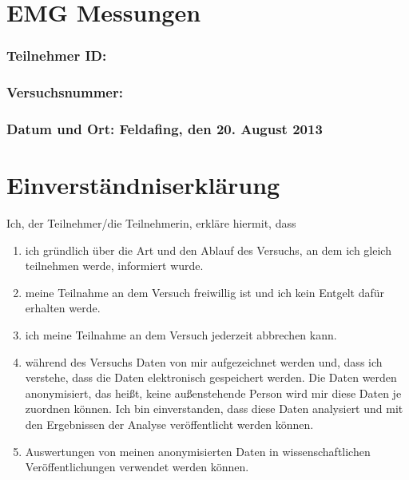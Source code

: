 \documentclass{article}
\begin{document}
\section*{EMG Messungen}
\subsubsection*{Teilnehmer ID:}
\subsubsection*{Versuchsnummer:}
\subsubsection*{Datum und Ort: Feldafing, den 20. August 2013}
\vspace{1cm}
\section*{Einverständniserklärung}

Ich, der Teilnehmer/die Teilnehmerin, erkläre hiermit, dass
\begin{enumerate}
\item ich gr\"undlich \"uber die Art und den Ablauf des Versuchs, an dem ich gleich teilnehmen werde, informiert wurde.
\item meine Teilnahme an dem Versuch freiwillig ist und ich kein Entgelt daf\"ur erhalten werde.
\item ich meine Teilnahme an dem Versuch jederzeit abbrechen kann.
\item während des Versuchs Daten von mir aufgezeichnet werden und, dass ich verstehe, dass die Daten elektronisch gespeichert werden. Die Daten werden anonymisiert, das hei\ss t, keine au\ss enstehende Person wird mir diese Daten je zuordnen können. Ich bin einverstanden, dass diese Daten analysiert und mit den Ergebnissen der Analyse veröffentlicht werden können.
\item Auswertungen von meinen anonymisierten Daten in wissenschaftlichen Veröffentlichungen verwendet werden k\"onnen.
\end{enumerate}
\end{document}
